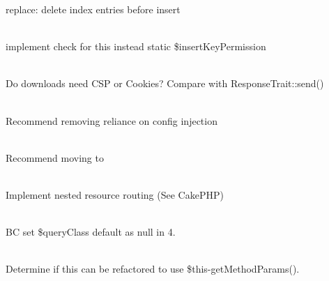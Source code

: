 \begin{DoxyRefList}
replace\+: delete index entries before insert  
\item[Member \doxylink{class_code_igniter_1_1_database_1_1_s_q_l_s_r_v_1_1_builder_ab9face4fd724ad774a972bf24db09eb6}{Code\+Igniter\textbackslash{}Database\textbackslash{}SQLSRV\textbackslash{}Builder\+::\+\_\+insert} (string \$table, array \$keys, array \$unescaped\+Keys)]\hfill \\
\label{todo__todo000003}%
%
implement check for this instead static \$insert\+Key\+Permission  
\item[Member \doxylink{class_code_igniter_1_1_h_t_t_p_1_1_download_response_ab2244d48e016bc64332d8e6f6938d502}{Code\+Igniter\textbackslash{}HTTP\textbackslash{}Download\+Response\+::send} ()]\hfill \\
\label{todo__todo000006}%
%
Do downloads need CSP or Cookies? Compare with Response\+Trait\+::send()  
\item[Member \doxylink{class_code_igniter_1_1_h_t_t_p_1_1_response_a1423af1598ffb410a5d5845e7b9a3d31}{Code\+Igniter\textbackslash{}HTTP\textbackslash{}Response\+::\+\_\+\+\_\+construct} (\$config)]\hfill \\
\label{todo__todo000007}%
%
Recommend removing reliance on config injection 
\item[Member \doxylink{interface_code_igniter_1_1_h_t_t_p_1_1_response_interface_a5b34b2215974949e0828f82506fb9a34}{Code\+Igniter\textbackslash{}HTTP\textbackslash{}Response\+Interface\+::set\+Link} (\doxylink{interface_code_igniter_1_1_pager_1_1_pager_interface}{Pager\+Interface} \$pager)]\hfill \\
\label{todo__todo000008}%
%
Recommend moving to   
\item[Class \doxylink{class_code_igniter_1_1_router_1_1_route_collection}{Code\+Igniter\textbackslash{}Router\textbackslash{}Route\+Collection} ]\hfill \\
\label{todo__todo000011}%
%
Implement nested resource routing (See Cake\+PHP)  
\item[Member \doxylink{class_code_igniter_1_1_test_1_1_mock_1_1_mock_connection_abd286543b556ede946e70298e6d980b8}{Code\+Igniter\textbackslash{}Test\textbackslash{}Mock\textbackslash{}Mock\+Connection\+::query} (string \$sql, \$binds=null, bool \$set\+Escape\+Flags=true, string \$query\+Class=\textquotesingle{}\textquotesingle{})]\hfill \\
\label{todo__todo000013}%
%
BC set \$query\+Class default as null in 4.  
\item[Member \doxylink{class_code_igniter_1_1_view_1_1_cell_aaa2bc7d735ccf7bfba29e689bd487689}{Code\+Igniter\textbackslash{}View\textbackslash{}Cell\+::render\+Simple\+Class} (\$instance, string \$method, array \$params, string \$class)]\hfill \\
\label{todo__todo000014}%
%
Determine if this can be refactored to use \$this-\/get\+Method\+Params().
\end{DoxyRefList}